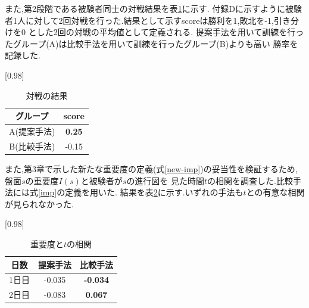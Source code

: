 \begin{table}[H]
    \caption{先読み手数制限なしの場合}
    \scriptsize
    \centering
    \label{table:system-100}
\end{table}
また,第2段階である被験者同士の対戦結果を表\ref{table:result-battle}に示す.
付録Dに示すように被験者1人に対して2回対戦を行った.結果として示すscoreは勝利を1,敗北を-1,引き分けを0
とした2回の対戦の平均値として定義される.
提案手法を用いて訓練を行ったグループ(A)は比較手法を用いて訓練を行ったグループ(B)よりも高い
勝率を記録した.
\begin{table}[H]
	\caption{対戦の結果}
    \label{table:result-battle}
	\centering
	\scalebox{0.98}[0.98]{
		\begin{tabular}{c|c}
			グループ & score \\ \hline
			A(提案手法)    & \bf{0.25} \\ 
			B(比較手法)    & -0.15 \\
		\end{tabular}
	}
	
\end{table}
また,第3章で示した新たな重要度の定義(式\ref{new-imp})の妥当性を検証するため,盤面$s$の重要度$I(s)$と被験者が$s$の進行図を
見た時間$t$の相関を調査した.比較手法には式\ref{imp}の定義を用いた.
結果を表\ref{table:result-imp}に示す.いずれの手法も$t$との有意な相関が見られなかった.
\begin{table}[H]
	\caption{重要度と$t$の相関}
    \label{table:result-imp}
	\centering
	\scalebox{0.98}[0.98]{
		\begin{tabular}{c|c|c}
			日数& 提案手法 & 比較手法 \\ \hline
			1日目& {-0.035}& \bf{-0.034}\\
            2日目& {-0.083}& \bf{0.067}\\
		\end{tabular}
	}
	
\end{table}


